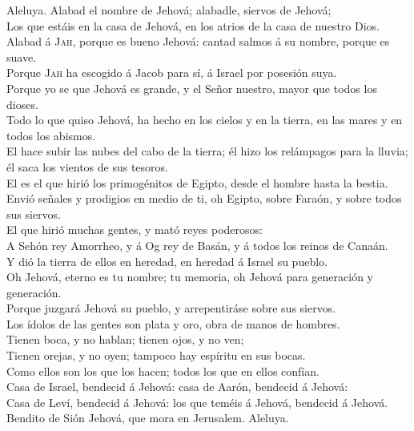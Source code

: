  Aleluya. Alabad el nombre de Jehová; alabadle, siervos de
Jehová;\\
 Los que estáis en la casa de Jehová, en los atrios de la
casa de nuestro Dios.\\
 Alabad á \textsc{Jah}, porque es bueno Jehová: cantad
salmos á su nombre, porque es suave.\\
 Porque \textsc{Jah} ha escogido á Jacob para sí, á Israel
por posesión suya.\\
 Porque yo se que Jehová es grande, y el Señor nuestro,
mayor que todos los dioses.\\
 Todo lo que quiso Jehová, ha hecho en los cielos y en la
tierra, en las mares y en todos los abismos.\\
 El hace subir las nubes del cabo de la tierra; él hizo
los relámpagos para la lluvia; él saca los vientos de sus tesoros.\\
 El es el que hirió los primogénitos de Egipto, desde el
hombre hasta la bestia.\\
 Envió señales y prodigios en medio de ti, oh Egipto,
sobre Faraón, y sobre todos sus siervos.\\
 El que hirió muchas gentes, y mató reyes poderosos:\\
 A Sehón rey Amorrheo, y á Og rey de Basán, y á todos los
reinos de Canaán.\\
 Y dió la tierra de ellos en heredad, en heredad á Israel
su pueblo.\\
 Oh Jehová, eterno es tu nombre; tu memoria, oh Jehová
para generación y generación.\\
 Porque juzgará Jehová su pueblo, y arrepentiráse sobre
sus siervos.\\
 Los ídolos de las gentes son plata y oro, obra de manos
de hombres.\\
 Tienen boca, y no hablan; tienen ojos, y no ven;\\
 Tienen orejas, y no oyen; tampoco hay espíritu en sus
bocas.\\
 Como ellos son los que los hacen; todos los que en ellos
confían.\\
 Casa de Israel, bendecid á Jehová: casa de Aarón,
bendecid á Jehová:\\
 Casa de Leví, bendecid á Jehová: los que teméis á
Jehová, bendecid á Jehová.\\
 Bendito de Sión Jehová, que mora en Jerusalem. Aleluya.

